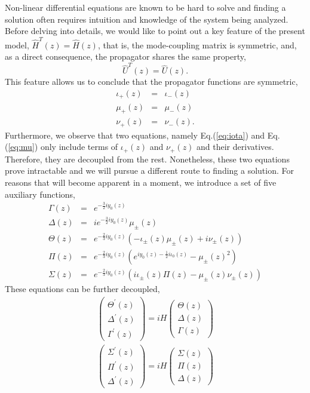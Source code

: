 \documentclass[9pt,twocolumn,twoside]{osajnl}
\begin{document}
Non-linear differential equations are known to be hard to solve and finding a solution 
often requires intuition and knowledge of the system being analyzed. 
Before delving into details, we would like to point out a key feature of the present model, $\hat{H}^{T}(z) = \hat{H}(z)$, that is, the mode-coupling matrix is symmetric, and, as a direct consequence, the propagator shares the same property,
\begin{equation}  
	\hat{U}^{T}(z)=\hat{U}(z).
\end{equation} 
This feature allows us to conclude that the propagator functions are symmetric,
\begin{eqnarray}
	\iota_{+}(z)&=&\iota_{-}(z) \label{eq:sym1}\\
	\mu_{+}(z)&=&\mu_{-}(z)\\
	\nu_{+}(z)&=&\nu_{-}(z) . \label{eq:sym3}
\end{eqnarray}
Furthermore, we observe that two equations, namely Eq.(\ref{eq:iota}) and Eq.(\ref{eq:mu}) only include terms of $\iota_{+}(z)$ and $\nu_{+}(z)$ and their derivatives. 
Therefore, they are decoupled from the rest. 
Nonetheless, these two equations prove intractable and we will pursue a different route to finding a solution.
For reasons that will become apparent in a moment, we introduce a set of five auxiliary functions,
\begin{eqnarray}
	\Gamma(z) &=& e^{-\frac{3}{2} i y_{0}(z)} \\
	\Delta(z)&=& i e^{-\frac{3}{2} i y_{0}(z)} \mu_{\pm}(z) \\
	   \Theta(z)&=& e^{-\frac{2}{3}i y_0(z)} (-\iota_{\pm}(z) \mu_{\pm}(z) + i \nu_{\pm}(z)) \\
	\Pi(z)&=& e^{-\frac{2}{3} i y_{0} (z)}
	    (e^{i y_0 (z)-\frac{1}{2} i \iota_0 (z)}
		-\mu_{\pm} (z)^2) \\
	\Sigma(z)&=& e^{-\frac{2}{3} i y_0(z)} (i \iota_{\pm}(z) \Pi(z)-\mu_{\pm} (z) \nu_{\pm}(z))
\end{eqnarray}
These equations can be further decoupled,
\begin{eqnarray}
	\left( \begin{array}{c}
		\Theta^{\prime}(z) \\
	\Delta^{\prime}(z) \\
	\Gamma^{\prime}(z) 
		\end{array} \right)=iH 
		\left( \begin{array}{c}
	\Theta(z) \\
	\Delta(z) \\
		\Gamma(z) 
	\end{array} \right) \label{eq:set1}\\
	\left( \begin{array}{c}
	\Sigma^{\prime}(z) \\
	\Pi^{\prime} (z) \\
	\Delta^{\prime}(z) 
	\end{array} \right)=iH 
	\left( \begin{array}{c}
	\Sigma(z) \label{eq:set2}\\
	\Pi (z) \\
	\Delta(z)  
	\end{array} \right)
	\end{eqnarray}
\end{document}
